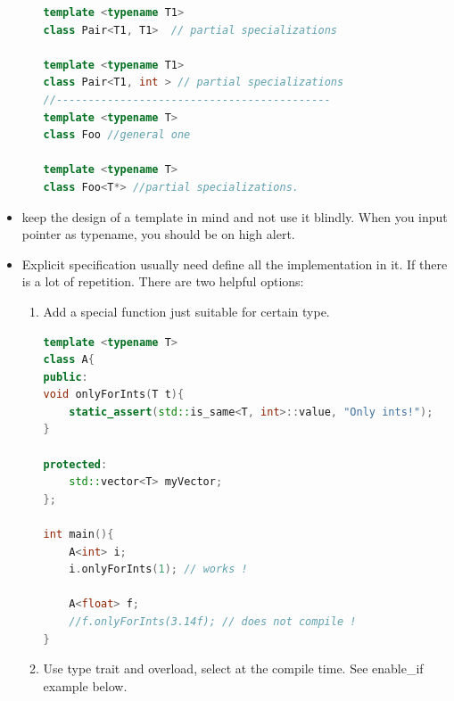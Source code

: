 \documentclass[a4paper,11pt,twoside]{book}
\begin{document}
\begin{itemize}
\begin{enumerate}
\begin{lstlisting}[frame=single, language=c++]
template <typename T1>
class Pair<T1, T1>  // partial specializations

template <typename T1>
class Pair<T1, int > // partial specializations
//-------------------------------------------
template <typename T>
class Foo //general one

template <typename T>
class Foo<T*> //partial specializations.
\end{lstlisting}

\end{enumerate}

\item keep the design of a template in mind and not use it blindly. When you input pointer as typename, you should be on high alert.

\item Explicit specification usually need define all the implementation in it. If there is a lot of repetition. There are two helpful options: 
\begin{enumerate}
	\item Add a special function just suitable for certain type. 
\begin{lstlisting}[frame=single, language=c++]
template <typename T>
class A{
public:
void onlyForInts(T t){
	static_assert(std::is_same<T, int>::value, "Only ints!");
}

protected:
	std::vector<T> myVector;
};

int main(){
    A<int> i;
    i.onlyForInts(1); // works !

    A<float> f;
    //f.onlyForInts(3.14f); // does not compile !
}
\end{lstlisting}

\item Use type trait and overload, select at the compile time. See enable\_if example below.

\end{enumerate}


\end{itemize}
\end{document}
